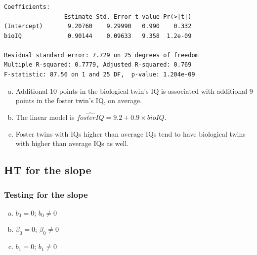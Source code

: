 \begin{frame}[fragile]
\frametitle{}


{\footnotesize
\begin{verbatim}
Coefficients:
                 Estimate Std. Error t value Pr(>|t|)    
(Intercept)       9.20760    9.29990   0.990    0.332    
bioIQ             0.90144    0.09633   9.358  1.2e-09

Residual standard error: 7.729 on 25 degrees of freedom
Multiple R-squared: 0.7779,	Adjusted R-squared: 0.769 
F-statistic: 87.56 on 1 and 25 DF,  p-value: 1.204e-09 
\end{verbatim}
}

\begin{enumerate}[(a)]
\item Additional 10 points in the biological twin's IQ is associated with additional 9 points in the foster twin's IQ, on average.
\item The linear model is $\widehat{fosterIQ} = 9.2 + 0.9 \times bioIQ$.
\item Foster twins with IQs higher than average IQs tend to have biological twins with higher than average IQs as well.
\end{enumerate}

\end{frame}


\subsection{HT for the slope}


\begin{frame}
\frametitle{Testing for the slope}


\begin{enumerate}[(a)]
\item {} $b_0 = 0$;  $b_0 \ne 0$ 
\item {} $\beta_0 = 0$;  $\beta_0 \ne 0$ 
\item {} $b_1 = 0$;  $b_1 \ne 0$ 
\end{enumerate}

\end{frame}

